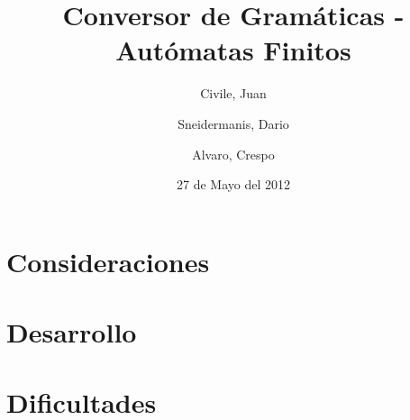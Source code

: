 \documentclass[11pt,a4paper,titlepage]{article}
\title{Conversor de Gramáticas - Autómatas Finitos}
\author{Civile, Juan \and Sneidermanis, Dario \and Alvaro, Crespo}
\date{27 de Mayo del 2012}
\begin{document}
\newcommand{\awesome}[1]{\texttt{\large #1}}

\maketitle
\tableofcontents
\clearpage

\section{Consideraciones}

\section{Desarrollo}

\section{Dificultades}
\end{document}
